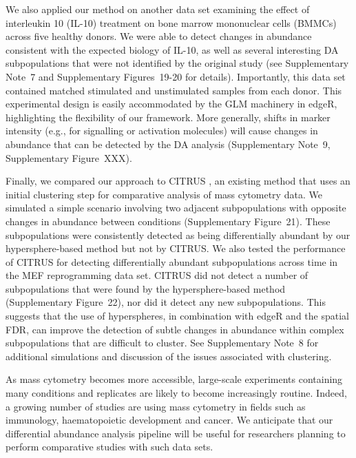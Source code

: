 \documentclass{article}
\newcommand{\suppsecbmmc}{7}
\newcommand{\suppsecclust}{8}
\newcommand{\suppsecsignal}{9}
\newcommand{\suppfigbmmc}{19}
\newcommand{\suppfigbmmcmark}{20}
\newcommand{\suppfigclustersim}{21}
\newcommand{\suppfigclusterreal}{22}
\begin{document}
We also applied our method on another data set \cite{levine2015datadriven} examining the effect of interleukin 10 (IL-10) treatment on bone marrow mononuclear cells (BMMCs) across five healthy donors.
We were able to detect changes in abundance consistent with the expected biology of IL-10, as well as several interesting DA subpopulations that were not identified by the original study (see Supplementary Note~\suppsecbmmc{} and Supplementary Figures~\suppfigbmmc{}-\suppfigbmmcmark{} for details).
Importantly, this data set contained matched stimulated and unstimulated samples from each donor.
This experimental design is easily accommodated by the GLM machinery in edgeR, highlighting the flexibility of our framework.
More generally, shifts in marker intensity (e.g., for signalling or activation molecules) will cause changes in abundance that can be detected by the DA analysis (Supplementary Note~\suppsecsignal{}, Supplementary Figure~XXX).

Finally, we compared our approach to CITRUS \cite{bruggner2014automated}, an existing method that uses an initial clustering step for comparative analysis of mass cytometry data.
We simulated a simple scenario involving two adjacent subpopulations with opposite changes in abundance between conditions (Supplementary Figure~\suppfigclustersim{}).
These subpopulations were consistently detected as being differentially abundant by our hypersphere-based method but not by CITRUS.
We also tested the performance of CITRUS for detecting differentially abundant subpopulations across time in the MEF reprogramming data set.
CITRUS did not detect a number of subpopulations that were found by the hypersphere-based method (Supplementary Figure~\suppfigclusterreal{}), nor did it detect any new subpopulations.
This suggests that the use of hyperspheres, in combination with edgeR and the spatial FDR, can improve the detection of subtle changes in abundance within complex subpopulations that are difficult to cluster.
See Supplementary Note~\suppsecclust{} for additional simulations and discussion of the issues associated with clustering.

As mass cytometry becomes more accessible, large-scale experiments containing many conditions and replicates are likely to become increasingly routine.
Indeed, a growing number of studies are using mass cytometry in fields such as immunology, haematopoietic development and cancer.
We anticipate that our differential abundance analysis pipeline will be useful for researchers planning to perform comparative studies with such data sets.
\end{document}
